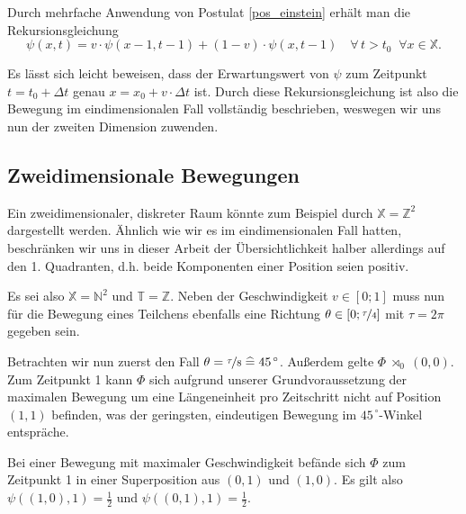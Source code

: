\documentclass[a4paper,12pt,ngerman]{scrartcl}
\theoremstyle{plain}
\theoremstyle{plain}
\theoremstyle{plain}
\theoremstyle{plain}
\newcommand{\Z}{\mathbb{Z}}
\newcommand{\T}{\mathbb{T}}
\newcommand{\X}{\mathbb{X}}
\newcommand{\N}{\mathbb{N}}
\newcommand{\at}[1]{\;\rtimes_{#1}\;}
\begin{document}
Durch mehrfache Anwendung von Postulat \ref{pos_einstein} erhält man die Rekursionsgleichung
\[\psi(x,t)=v\cdot\psi(x-1,t-1)+(1-v)\cdot\psi(x,t-1) \quad\forall\, t>t_0 \;\;\forall x\in\X.\]

Es lässt sich leicht beweisen, dass der Erwartungswert von $\psi$ zum Zeitpunkt $t=t_0+\Delta t$ genau $x=x_0+v\cdot\Delta t$ ist. Durch diese Rekursionsgleichung ist also die Bewegung im eindimensionalen Fall vollständig beschrieben, weswegen wir uns nun der zweiten Dimension zuwenden.



\subsection{Zweidimensionale Bewegungen}

Ein zweidimensionaler, diskreter Raum könnte zum Beispiel durch $\X=\Z^2$ dargestellt werden. Ähnlich wie wir es im eindimensionalen Fall hatten, beschränken wir uns in dieser Arbeit der Übersichtlichkeit halber allerdings auf den 1. Quadranten, d.h. beide Komponenten einer Position seien positiv. 

Es sei also $\X=\N^2$ und $\T=\Z$. Neben der Geschwindigkeit $v\in[0;1]$ muss nun für die Bewegung eines Teilchens ebenfalls eine Richtung $\theta\in[0;\nicefrac{\tau}{4}]$ mit $\tau=2\pi$ gegeben sein.

Betrachten wir nun zuerst den Fall $\theta=\nicefrac{\tau}{8}\;\widehat{=}\;45^{\,\circ}$. Außerdem gelte $\Phi\at{0} (0,0)$. Zum Zeitpunkt 1 kann $\Phi$ sich aufgrund unserer Grundvoraussetzung der maximalen Bewegung um eine Längeneinheit pro Zeitschritt nicht auf Position $(1,1)$ befinden, was der geringsten, eindeutigen Bewegung im $45^{\,\circ}$-Winkel entspräche.

Bei einer Bewegung mit maximaler Geschwindigkeit befände sich $\Phi$ zum Zeitpunkt 1 in einer Superposition aus $(0,1)$ und $(1,0)$. Es gilt also $\psi((1,0),1)=\frac{1}{2}$ und $\psi((0,1),1)=\frac{1}{2}$.
\end{document}
